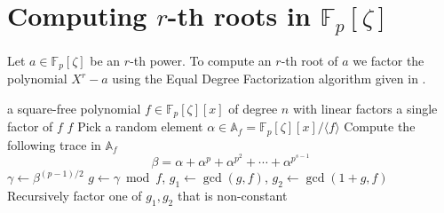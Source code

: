 \documentclass[12pt]{article}
\theoremstyle{plain}
\theoremstyle{definition}
\def\F{\mathbb{F}}
\newcounter{algorithm}
\begin{document}

\section{Computing $r$-th roots in $\F_p[\zeta]$}
\label{subsection:rth-root-fpz}

Let $a \in \F_p[\zeta]$ be an $r$-th power. To compute an $r$-th root of $a$ we factor the polynomial $X^r - a$ using the Equal
Degree Factorization algorithm given in \cite{kaltofen1997fast}.

\begin{algorithm}
\label{algorithm:edf}
	\begin{algorithmic}[1]
		\REQUIRE a square-free polynomial $f \in \F_p[\zeta][x]$ of degree $n$ with linear factors
		\ENSURE a single factor of $f$
			\RETURN $f$
		\ENDIF
		\STATE Pick a random element $\alpha \in \mathbb{A}_f = \F_p[\zeta][x]/\langle f \rangle$
		\STATE\label{step:edf-trace} Compute the following trace in $\mathbb{A}_f$
			\[ \beta = \alpha + \alpha^p + \alpha^{p^2} + \cdots + \alpha^{p^{s - 1}} \]
		\STATE $\gamma \leftarrow \beta^{(p - 1) / 2}$
		\STATE $g \leftarrow \gamma \bmod f$, $g_1 \leftarrow \gcd(g, f)$, $g_2 \leftarrow \gcd(1 + g, f)$
		\STATE Recursively factor one of $g_1, g_2$ that is non-constant
	\end{algorithmic}
\end{algorithm}
\end{document}

